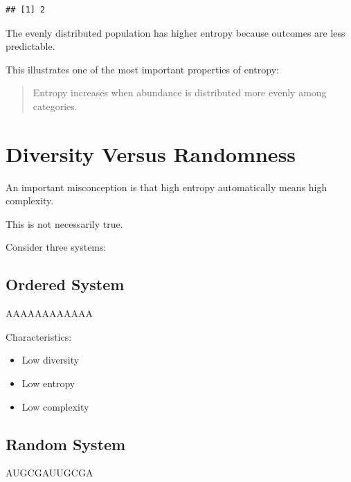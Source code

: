 \documentclass[
  oneside,
  openany]{book}
\newenvironment{Shaded}{\begin{snugshade}}{\end{snugshade}}
\newcommand{\NormalTok}[1]{#1}
\providecommand{\tightlist}{%
  \setlength{\itemsep}{0pt}\setlength{\parskip}{0pt}}
\begin{document}
\begin{verbatim}
## [1] 2
\end{verbatim}

The evenly distributed population has higher entropy because outcomes are less predictable.

This illustrates one of the most important properties of entropy:

\begin{quote}
Entropy increases when abundance is distributed more evenly among categories.
\end{quote}

\section{Diversity Versus Randomness}\label{diversity-versus-randomness}

An important misconception is that high entropy automatically means high complexity.

This is not necessarily true.

Consider three systems:

\subsection{Ordered System}\label{ordered-system}

\begin{Shaded}
\begin{Highlighting}[]
\NormalTok{AAAAAAAAAAAA}
\end{Highlighting}
\end{Shaded}

Characteristics:

\begin{itemize}
\tightlist
\item
  Low diversity
\item
  Low entropy
\item
  Low complexity
\end{itemize}

\subsection{Random System}\label{random-system}

\begin{Shaded}
\begin{Highlighting}[]
\NormalTok{AUGCGAUUGCGA}
\end{Highlighting}
\end{Shaded}
\end{document}
